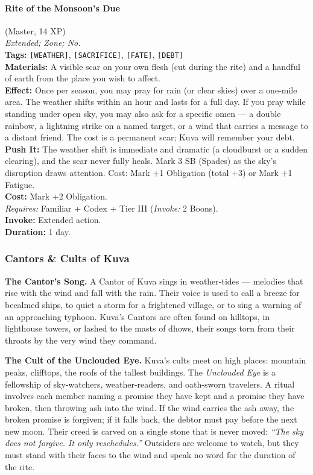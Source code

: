 \paragraph{Rite of the Monsoon's Due} (Master, 14 XP) \hfill \\
\emph{Extended; Zone; No.} \\
\textbf{Tags:} \texttt{[WEATHER]}, \texttt{[SACRIFICE]}, \texttt{[FATE]}, \texttt{[DEBT]} \\
\textbf{Materials:} A visible scar on your own flesh (cut during the rite) and a handful of earth from the place you wish to affect. \\
\textbf{Effect:} Once per season, you may pray for rain (or clear skies) over a one-mile area. The weather shifts within an hour and lasts for a full day. If you pray while standing under open sky, you may also ask for a specific omen --- a double rainbow, a lightning strike on a named target, or a wind that carries a message to a distant friend. The cost is a permanent scar; Kuva will remember your debt. \\
\textbf{Push It:} The weather shift is immediate and dramatic (a cloudburst or a sudden clearing), and the scar never fully heals. Mark 3 SB (Spades) as the sky's disruption draws attention. Cost: Mark +1 Obligation (total +3) or Mark +1 Fatigue. \\
\textbf{Cost:} Mark +2 Obligation. \\
\textit{Requires:} Familiar + Codex + Tier III (\textit{Invoke:} 2 Boons). \\
\textbf{Invoke:} Extended action. \\
\textbf{Duration:} 1 day.

\subsubsection*{Cantors \& Cults of Kuva}

\textbf{The Cantor's Song.} A Cantor of Kuva sings in weather-tides --- melodies that rise with the wind and fall with the rain. Their voice is used to call a breeze for becalmed ships, to quiet a storm for a frightened village, or to sing a warning of an approaching typhoon. Kuva's Cantors are often found on hilltops, in lighthouse towers, or lashed to the masts of dhows, their songs torn from their throats by the very wind they command.

\textbf{The Cult of the Unclouded Eye.} Kuva's cults meet on high places: mountain peaks, clifftops, the roofs of the tallest buildings. The \textit{Unclouded Eye} is a fellowship of sky-watchers, weather-readers, and oath-sworn travelers. A ritual involves each member naming a promise they have kept and a promise they have broken, then throwing ash into the wind. If the wind carries the ash away, the broken promise is forgiven; if it falls back, the debtor must pay before the next new moon. Their creed is carved on a single stone that is never moved: \textit{``The sky does not forgive. It only reschedules.''} Outsiders are welcome to watch, but they must stand with their faces to the wind and speak no word for the duration of the rite.

